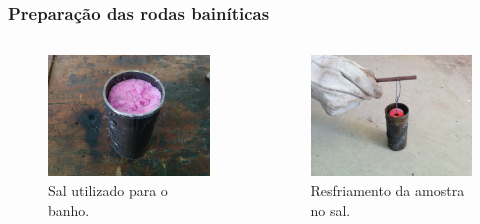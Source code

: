\documentclass{beamer}
\begin{document}
\begin{frame}
\frametitle{Preparação das rodas bainíticas}
\begin{columns}[c] %
	\begin{figure}
		\centering
		\includegraphics[width=1\textwidth]{sais}
		\caption{Sal utilizado para o banho.}
		\label{fig:sais}
	\end{figure}
	
	\begin{figure}
		\centering
		\includegraphics[width=1\textwidth]{resfriamento}
		\caption{Resfriamento da amostra no sal.}
		\label{fig:resfriamento}
	\end{figure}
\end{columns}
\end{frame}
\end{document}
